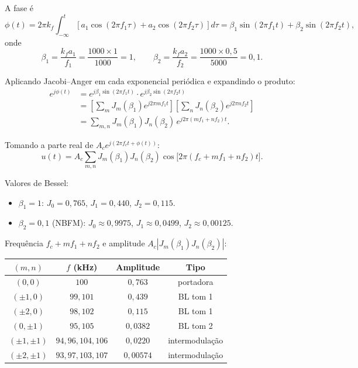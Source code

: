 \documentclass[11pt,a4paper]{article}
\begin{document}
\begin{resolucao}

A fase é
\[
  \phi(t) = 2\pi k_f \!\!\int_{-\infty}^{t}\!\![a_1\cos(2\pi f_1\tau) + a_2\cos(2\pi f_2\tau)]d\tau
         = \beta_1\sin(2\pi f_1 t) + \beta_2\sin(2\pi f_2 t),
\]
onde
\[
  \beta_1 = \frac{k_f a_1}{f_1} = \frac{1000 \times 1}{1000} = 1, \qquad
  \beta_2 = \frac{k_f a_2}{f_2} = \frac{1000 \times 0{,}5}{5000} = 0{,}1.
\]

Aplicando Jacobi--Anger em cada exponencial periódica e expandindo o produto:
\begin{align*}
  e^{j\phi(t)} &= e^{j\beta_1\sin(2\pi f_1 t)}\cdot e^{j\beta_2\sin(2\pi f_2 t)} \\
              &= \left[\sum_{m}J_m(\beta_1)e^{j2\pi m f_1 t}\right]\!\left[\sum_{n}J_n(\beta_2)e^{j2\pi n f_2 t}\right] \\
              &= \sum_{m,n} J_m(\beta_1)J_n(\beta_2)\,e^{j2\pi(m f_1 + n f_2)t}.
\end{align*}

Tomando a parte real de $A_c e^{j(2\pi f_c t + \phi(t))}$:
\[
  \boxed{u(t) = A_c\sum_{m,n}\!J_m(\beta_1)J_n(\beta_2)\cos\!\big[2\pi(f_c + m f_1 + n f_2)t\big].}
\]
\end{resolucao}

\begin{resolucao}

Valores de Bessel:
\begin{itemize}\itemsep0pt
  \item $\beta_1 = 1$: $J_0 = 0{,}765$, $J_1 = 0{,}440$, $J_2 = 0{,}115$.
  \item $\beta_2 = 0{,}1$ (NBFM): $J_0 \approx 0{,}9975$, $J_1 \approx 0{,}0499$, $J_2 \approx 0{,}00125$.
\end{itemize}

Frequência $f_c + m f_1 + n f_2$ e amplitude $A_c|J_m(\beta_1)J_n(\beta_2)|$:

\begin{center}
\small
\begin{tabular}{cccc}
\toprule
$(m,n)$ & $f$ (kHz) & Amplitude & Tipo \\
\midrule
$(0,0)$ & $100$ & $0{,}763$ & portadora \\
$(\pm 1,0)$ & $99, 101$ & $0{,}439$ & BL tom 1 \\
$(\pm 2,0)$ & $98, 102$ & $0{,}115$ & BL tom 1 \\
$(0,\pm 1)$ & $95, 105$ & $0{,}0382$ & BL tom 2 \\
$(\pm 1,\pm 1)$ & $94, 96, 104, 106$ & $0{,}0220$ & intermodulação \\
$(\pm 2,\pm 1)$ & $93, 97, 103, 107$ & $0{,}00574$ & intermodulação \\
\bottomrule
\end{tabular}
\end{center}
\end{resolucao}
\end{document}
